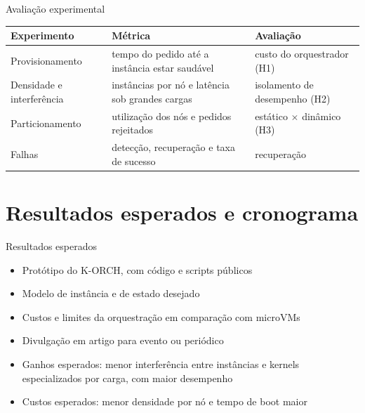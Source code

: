 \documentclass[aspectratio=169]{beamer}
\begin{document}
{%
        \begin{frame}{Avaliação experimental}
            \centering
            \vspace{2mm}
            \renewcommand{\arraystretch}{1.9}
            \small
            \begin{tabular}{>{\raggedright\arraybackslash}p{2.5cm}>{\raggedright\arraybackslash}p{5.0cm}>{\raggedright\arraybackslash}p{4.0cm}}
                \textbf{Experimento} & \textbf{Métrica} & \textbf{Avaliação} \\
                \hline
                Provisionamento           & tempo do pedido até a instância estar saudável  & custo do orquestrador (H1) \\
                Densidade e interferência & instâncias por nó e latência sob grandes cargas & isolamento de desempenho (H2) \\
                Particionamento           & utilização dos nós e pedidos rejeitados         & estático $\times$ dinâmico (H3) \\
                Falhas                    & detecção, recuperação e taxa de sucesso         & recuperação \\
                \hline
            \end{tabular}
        \end{frame}

        \section{Resultados esperados e cronograma}

        \begin{frame}{Resultados esperados}
            \begin{itemize}
                \item Protótipo do K-ORCH, com código e scripts públicos
                \item Modelo de instância e de estado desejado
                \item Custos e limites da orquestração em comparação com microVMs
                \item Divulgação em artigo para evento ou periódico
                \item Ganhos esperados: menor interferência entre instâncias e kernels especializados por carga, com maior desempenho
                \item Custos esperados: menor densidade por nó e tempo de boot maior
            \end{itemize}
        \end{frame}

}
\end{document}
